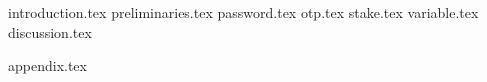 {introduction.tex}
{preliminaries.tex}
{password.tex}
{otp.tex}
{stake.tex}
{variable.tex}
{discussion.tex}

\appendix
{appendix.tex}
